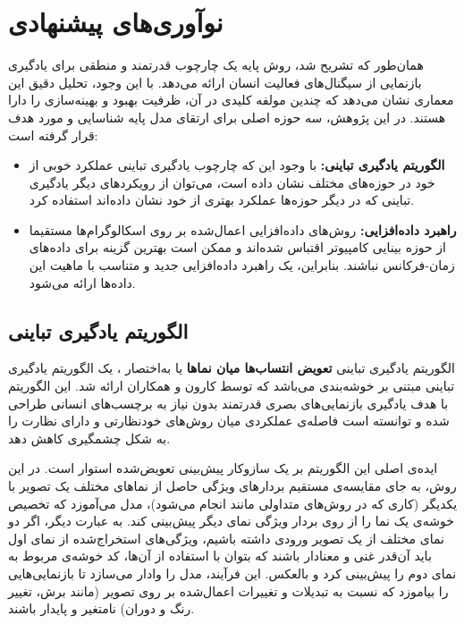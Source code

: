 \section{نوآوری‌های پیشنهادی}

همان‌طور که تشریح شد، روش پایه یک چارچوب قدرتمند و منطقی برای یادگیری بازنمایی از سیگنال‌های فعالیت انسان ارائه می‌دهد. با این وجود، تحلیل دقیق این معماری نشان می‌دهد که چندین مولفه کلیدی در آن، ظرفیت بهبود و بهینه‌سازی را دارا هستند. در این پژوهش، سه حوزه اصلی برای ارتقای مدل پایه شناسایی و مورد هدف قرار گرفته است:
\begin{itemize}
    \item\textbf{الگوریتم یادگیری تباینی:}
    با وجود این که چارچوب یادگیری تباینی 
    عملکرد خوبی از خود در حوزه‌های مختلف نشان داده است، می‌توان از رویکردهای دیگر یادگیری تباینی که در دیگر حوزه‌ها عملکرد بهتری از خود نشان داده‌اند استفاده کرد.
    \item\textbf{راهبرد داده‌افزایی:}
    روش‌های داده‌افزایی اعمال‌شده بر روی اسکالوگرام‌ها مستقیما از حوزه بینایی کامپیوتر اقتباس شده‌اند و ممکن است بهترین گزینه برای داده‌های زمان-فرکانس نباشند. بنابراین، یک راهبرد داده‌افزایی جدید و متناسب با ماهیت این داده‌ها ارائه می‌شود.
\end{itemize}

\subsection{الگوریتم یادگیری تباینی }

الگوریتم یادگیری تباینی
\textbf{تعویض انتساب‌ها میان نماها} یا به‌اختصار ،
یک الگوریتم یادگیری تباینی مبتنی بر خوشه‌بندی می‌باشد که توسط کارون و همکاران\cite{caron2020unsupervised} ارائه شد. این الگوریتم با هدف یادگیری بازنمایی‌های بصری قدرتمند بدون نیاز به برچسب‌های انسانی طراحی شده و توانسته است فاصله‌ی عملکردی میان روش‌های خودنظارتی و دارای نظارت را به شکل چشمگیری کاهش دهد.

ایده‌ی اصلی این الگوریتم بر یک سازوکار پیش‌بینی تعویض‌شده
استوار است. در این روش، به جای مقایسه‌ی مستقیم بردارهای ویژگی حاصل از نماهای مختلف یک تصویر با یکدیگر (کاری که در روش‌های متداولی مانند  انجام می‌شود)، مدل می‌آموزد که تخصیص خوشه‌ی یک نما را از روی بردار ویژگی نمای دیگر پیش‌بینی کند. به عبارت دیگر، اگر دو نمای مختلف از یک تصویر ورودی داشته باشیم، ویژگی‌های استخراج‌شده از نمای اول باید آن‌قدر غنی و معنادار باشند که بتوان با استفاده از آن‌ها، کد خوشه‌ی مربوط به نمای دوم را پیش‌بینی کرد و بالعکس. این فرآیند، مدل را وادار می‌سازد تا بازنمایی‌هایی را بیاموزد که نسبت به تبدیلات و تغییرات اعمال‌شده بر روی تصویر (مانند برش، تغییر رنگ و دوران) نامتغیر و پایدار باشند.

